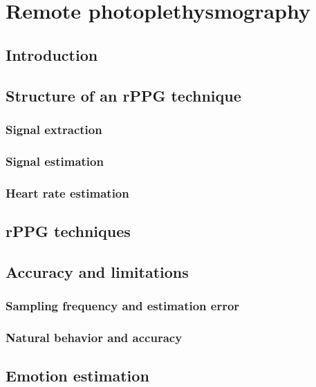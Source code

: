 \chapter{Remote photoplethysmography}


\section{Introduction}
\section{Structure of an rPPG technique}
\subsection{Signal extraction}
\subsection{Signal estimation}
\subsection{Heart rate estimation}
\section{rPPG techniques}
\section{Accuracy and limitations}
\subsection{Sampling frequency and estimation error}
\subsection{Natural behavior and accuracy}
\section{Emotion estimation}
